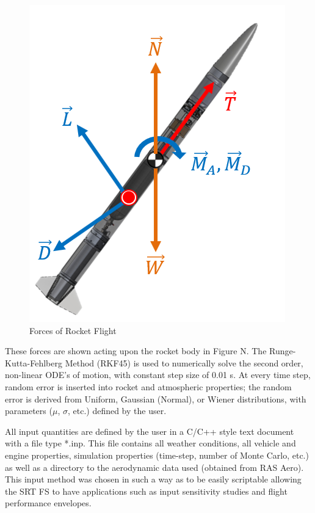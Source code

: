 \documentclass[10pt,a4paper]{article}
\begin{document}
\begin{figure}[h!]
	\centering
	\includegraphics[width=.3\textwidth]{./figs/rocket_force.png}
	\caption{Forces of Rocket Flight}
	\label{fig:rocket_force}
\end{figure}


These forces are shown acting upon the rocket body in Figure N. The Runge-Kutta-Fehlberg Method (RKF45) is used to numerically solve the second order, non-linear ODE's of motion, with constant step size of 0.01 s. At every time step, random error is inserted into rocket and atmospheric properties; the random error is derived from Uniform, Gaussian (Normal), or Wiener distributions, with parameters ($\mu$, $\sigma$, etc.) defined by the user.

All input quantities are defined by the user in a C/C++ style text document with a file type *.inp. This file contains all weather conditions, all vehicle and engine properties, simulation properties (time-step, number of Monte Carlo, etc.) as well as a directory to the aerodynamic data used (obtained from RAS Aero). This input method was chosen in such a way as to be easily scriptable allowing the SRT FS to have applications such as input sensitivity studies and flight performance envelopes.
\end{document}
